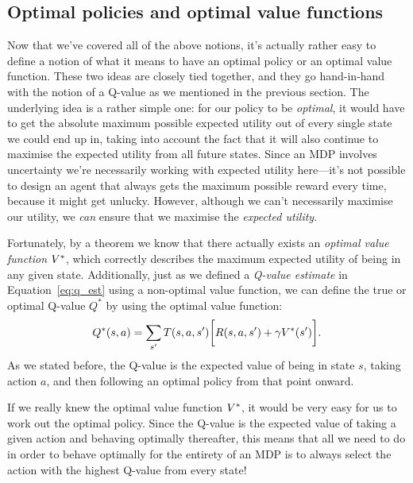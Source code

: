 \documentclass[a4paper]{article}
\begin{document}
\subsection{Optimal policies and optimal value functions} \label{ssec:optimal}
Now that we've covered all of the above notions, it's actually rather easy
to define a notion of what it means to have an optimal policy
or an optimal value function.
These two ideas are closely tied together, and they go hand-in-hand with
the notion of a Q-value as we mentioned in the previous section.
The underlying idea is a rather simple one:
for our policy to be \emph{optimal},
it would have to get the absolute maximum possible expected utility
out of every single state we could end up in,
taking into account the fact that it will also continue to maximise
the expected utility from all future states.
Since an MDP involves uncertainty we're necessarily working with
expected utility here---it's not possible to design an agent that
always gets the maximum possible reward every time, because it
might get unlucky.
However, although we can't necessarily maximise our utility, we \emph{can}
ensure that we maximise the \emph{expected utility}.

Fortunately, by a theorem we know that there actually exists an
\emph{optimal value function} $V^*$, which correctly describes the maximum
expected utility of being in any given state. Additionally, just as we
defined a \emph{Q-value estimate} in Equation~\ref{eq:q_est} using a non-optimal
value function,
we can define the true or optimal Q-value $Q^*$ by using the optimal value
function:
\begin{equation} \label{eq:q}
  Q^*(s, a) = \sum_{s'} T(s, a, s') \bigg[ R(s, a, s') + \gamma V^*(s') \bigg] .
\end{equation}
As we stated before, the Q-value is the expected value of being in state $s$,
taking action $a$, and then following an optimal policy from that point onward.

If we really knew the optimal value function $V^*$, it would be very easy for
us to work out the optimal policy.
Since the Q-value is the expected value of taking a given action and behaving
optimally thereafter, this means that all we need to do in order to behave
optimally for the entirety of an MDP is to always select the action with the
highest Q-value from every state!
\end{document}
